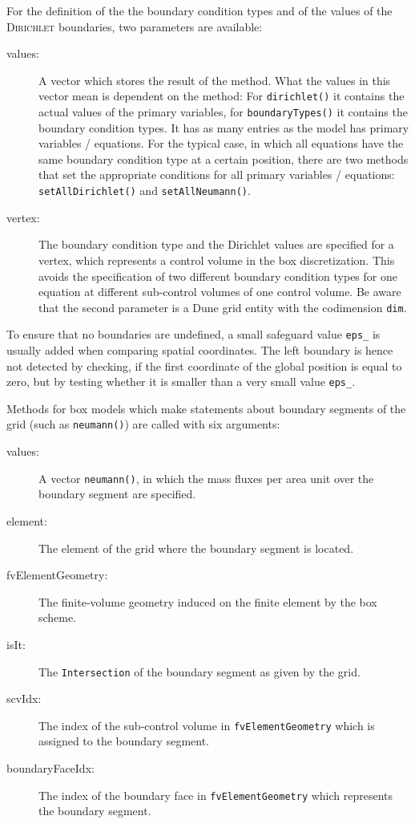For the definition of the the boundary condition types and of the
values of the \textsc{Dirichlet} boundaries, two parameters are
available:
\begin{description}
 \item [values:]  A vector which stores the result of the method. What
  the values in this vector mean is dependent on the method: For
  \texttt{dirichlet()} it contains the actual values of the primary
  variables, for \texttt{boundaryTypes()} it contains the boundary 
  condition types. It has as many entries as the model has primary variables / equations.
  For the typical case, in which all equations have the same boundary
  condition type at a certain position, there are two methods that set the appropriate conditions
  for all primary variables / equations: \texttt{setAllDirichlet()} and \texttt{setAllNeumann()}.
\item [vertex:] The boundary condition type and the Dirichlet values are
  specified for a vertex, which represents a control volume in the box
  discretization. This avoids the specification of two different
  boundary condition types for one equation at different sub-control
  volumes of one control volume.  Be aware that the second parameter is a Dune grid entity
  with the codimension \texttt{dim}.
\end{description}

To ensure that no boundaries are undefined, a small safeguard value
\texttt{eps\_} is usually added when comparing spatial
coordinates. The left boundary is hence not detected by checking, if the
first coordinate of the global position is equal to zero, but by testing whether it is
smaller than a very small value \texttt{eps\_}.

Methods for box models which make statements about boundary segments of the grid
(such as \texttt{neumann()}) are called with six arguments:
\begin{description}
\item[values:] A vector \texttt{neumann()}, in which the mass fluxes per area unit
  over the boundary segment are specified.
\item[element:] The element of the grid where the boundary segment
  is located.
\item[fvElementGeometry:] The finite-volume geometry induced on the
  finite element by the box scheme.
\item[isIt:] The \texttt{Intersection} of the boundary segment as given by the grid.
\item[scvIdx:] The index of the sub-control volume in
  \texttt{fvElementGeometry} which is assigned to the boundary segment.
\item[boundaryFaceIdx:] The index of the boundary face in
  \texttt{fvElementGeometry} which represents the boundary segment.  
\end{description}

